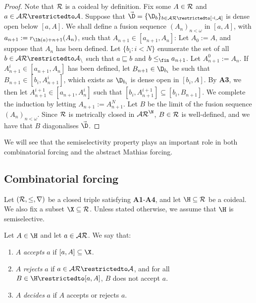 \documentclass[11pt,reqno]{amsart}
\begin{document}
\begin{proof}
    Note that $\cal{R}$ is a coideal by definition. Fix some $A \in \cal{R}$ and $a \in \cal{AR}\restrictedto A$. Suppose that $\vec{\D} = \{\D_b\}_{b \in \cal{AR}\restrictedto[a,A]}$ is dense open below $[a,A]$. We shall define a fusion sequence $(A_n)_{n<\omega}$ in $[a,A]$, with $a_{n+1} := r_{\lh(a)+n+1}(A_n)$, such that $A_{n+1} \in [a_{n+1},A_n]$: Let $A_0 := A$, and suppose that $A_n$ has been defined. Let $\{b_i : i < N\}$ enumerate the set of all $b \in \cal{AR}\restrictedto A_n$ such that $a \sqsubseteq b$ and $b \leq_\fin a_{n+1}$. Let $A_{n+1}^0 := A_n$. If $A_{n+1}^i \in [a_{n+1},A_n]$ has been defined, let $B_{n+1} \in \D_{b_i}$ be such that $B_{n+1} \in [b_i,A_{n+1}^i]$, which exists as $\D_{b_i}$ is dense open in $[b_i,A]$. By \textbf{A3}, we then let $A_{n+1}^{i+1} \in [a_{n+1},A_n^i]$ such that $[b_i,A_{n+1}^{i+1}] \subseteq [b_i,B_{n+1}]$. We complete the induction by letting $A_{n+1} := A_{n+1}^N$. Let $B$ be the limit of the fusion sequence $(A_n)_{n<\omega}$. Since $\cal{R}$ is metrically closed in $\cal{AR}^\N$, $B \in \cal{R}$ is well-defined, and we have that $B$ diagonalises $\vec{\D}$. 
\end{proof}

We will see that the semiselectivity property plays an important role in both combinatorial forcing and the abstract Mathias forcing.

\subsection{Combinatorial forcing}
Let $(\cal{R},\leq,r)$ be a closed triple satisfying \textbf{A1}-\textbf{A4}, and let $\H \subseteq \cal{R}$ be a coideal. We also fix a subset $\X \subseteq \cal{R}$. Unless stated otherwise, we assume that $\H$ is semiselective.

\begin{definition}
    Let $A \in \H$ and let $a \in \cal{AR}$. We say that: 
    \begin{enumerate}
        \item $A$ \emph{accepts} $a$ if $[a,A] \subseteq \X$.
        
        \item $A$ \emph{rejects} $a$ if $a \in \cal{AR}\restrictedto A$, and for all $B \in \H\restrictedto[a,A]$, $B$ does not accept $a$.
        
        \item $A$ \emph{decides} $a$ if $A$ accepts or rejects $a$.
    \end{enumerate}
\end{definition}
\end{document}

